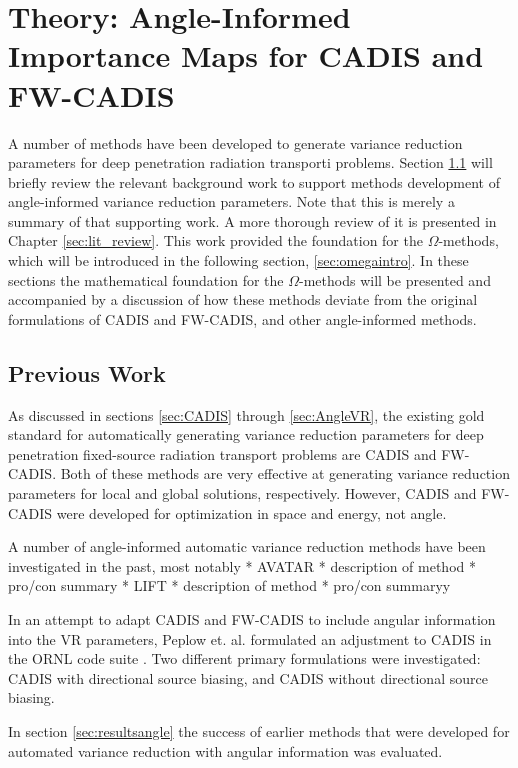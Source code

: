 \section{Theory: Angle-Informed Importance Maps for CADIS and FW-CADIS}
\label{sec:methodtheory}

A number of methods have been developed to generate variance reduction parameters
for deep penetration radiation transporti problems. Section \ref{sec:omegabknd} will
briefly review the
relevant background work to support methods development of angle-informed variance reduction
parameters. Note that this is merely a summary of that supporting work. A more
thorough review of it is presented in Chapter \ref{sec:lit_review}. This work provided the foundation for the $\Omega$-methods, which
will be introduced in the following section, \ref{sec:omegaintro}. In
these sections the mathematical foundation for the $\Omega$-methods will be
presented and accompanied by a discussion of how these methods deviate from the
original formulations of CADIS and FW-CADIS, and other angle-informed methods.

\subsection{Previous Work}
\label{sec:omegabknd}

As discussed in sections \ref{sec:CADIS}
through \ref{sec:AngleVR}, the existing gold standard for automatically
generating variance reduction parameters for deep penetration
fixed-source radiation transport problems are
CADIS and FW-CADIS. Both of these methods are very effective at
generating variance reduction parameters for local and global solutions,
respectively. However, CADIS and FW-CADIS were developed for optimization in
space and energy, not angle.

A number of angle-informed automatic variance reduction methods have been
investigated in the past, most notably
* AVATAR
  * description of method
  * pro/con summary
* LIFT
  * description of method
  * pro/con summaryy

In an attempt to adapt CADIS and FW-CADIS to include angular information into
the VR parameters, Peplow et. al. formulated an adjustment to CADIS in the ORNL
code suite \cite{peplow_consistent_2012}. Two different primary
formulations were investigated:
CADIS with directional source biasing, and CADIS without directional source
biasing.

In section \ref{sec:resultsangle} the success of earlier methods
that were developed for automated variance reduction with angular information
was evaluated.

